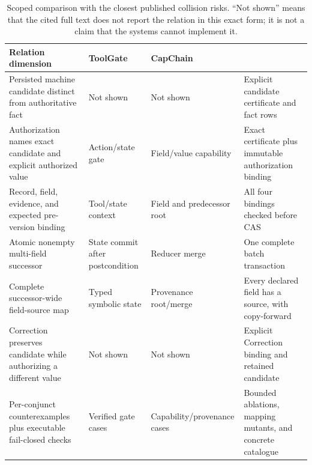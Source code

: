 \begin{table}[t]
\centering
\footnotesize
\caption{Scoped comparison with the closest published collision risks. ``Not shown'' means that the cited full text does not report the relation in this exact form; it is not a claim that the systems cannot implement it.}
\label{tab:toolgate-capchain}
\begin{tabularx}{\textwidth}{@{}>{\raggedright\arraybackslash}p{}>{\raggedright\arraybackslash}X>{\raggedright\arraybackslash}X>{\raggedright\arraybackslash}X@{}}
\toprule
Relation dimension & ToolGate & CapChain & \system{} \\
\midrule
Persisted machine candidate distinct from authoritative fact & Not shown & Not shown & Explicit candidate certificate and fact rows \\
Authorization names exact candidate and explicit authorized value & Action/state gate & Field/value capability & Exact certificate plus immutable authorization binding \\
Record, field, evidence, and expected pre-version binding & Tool/state context & Field and predecessor root & All four bindings checked before CAS \\
Atomic nonempty multi-field successor & State commit after postcondition & Reducer merge & One complete batch transaction \\
Complete successor-wide field-source map & Typed symbolic state & Provenance root/merge & Every declared field has a source, with copy-forward \\
Correction preserves candidate while authorizing a different value & Not shown & Not shown & Explicit Correction binding and retained candidate \\
Per-conjunct counterexamples plus executable fail-closed checks & Verified gate cases & Capability/provenance cases & Bounded ablations, mapping mutants, and concrete catalogue \\
\bottomrule
\end{tabularx}
\end{table}
